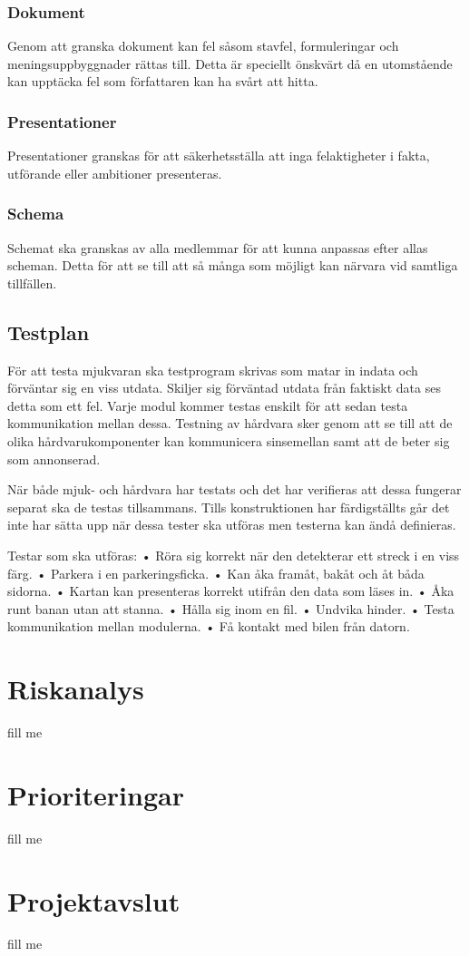 \documentclass[projektplan/plan.tex]{subfiles}
\begin{document}
\subsubsection{Dokument}	
Genom att granska dokument kan fel såsom stavfel, formuleringar och meningsuppbyggnader rättas till. Detta är speciellt önskvärt då en utomstående kan upptäcka fel som författaren kan ha svårt att hitta.

\subsubsection{Presentationer}	
Presentationer granskas för att säkerhetsställa att inga felaktigheter i fakta, utförande eller ambitioner presenteras.

\subsubsection{Schema}	
Schemat ska granskas av alla medlemmar för att kunna anpassas efter allas scheman. Detta för att se till att så många som möjligt kan närvara vid samtliga tillfällen. 

\subsection{Testplan}
För att testa mjukvaran ska testprogram skrivas som matar in indata och förväntar sig en viss utdata. Skiljer sig förväntad utdata från faktiskt data ses detta som ett fel. Varje modul kommer testas enskilt för att sedan testa kommunikation mellan dessa. Testning av hårdvara sker genom att se till att de olika hårdvarukomponenter kan kommunicera sinsemellan samt att de beter sig som annonserad.

När både mjuk- och hårdvara har testats och det har verifieras att dessa fungerar separat ska de testas tillsammans. Tills konstruktionen har färdigställts går det inte har sätta upp när dessa tester ska utföras men testerna kan ändå definieras.

Testar som ska utföras:
•	Röra sig korrekt när den detekterar ett streck i en viss färg.
•	Parkera i en parkeringsficka.
•	Kan åka framåt, bakåt och åt båda sidorna.
•	Kartan kan presenteras korrekt utifrån den data som läses in.
•	Åka runt banan utan att stanna.
•	Hålla sig inom en fil.
•	Undvika hinder.
•	Testa kommunikation mellan modulerna.
•	Få kontakt med bilen från datorn.

\section{Riskanalys}
fill me

\section{Prioriteringar}
fill me

\section{Projektavslut}
fill me
\end{document}
